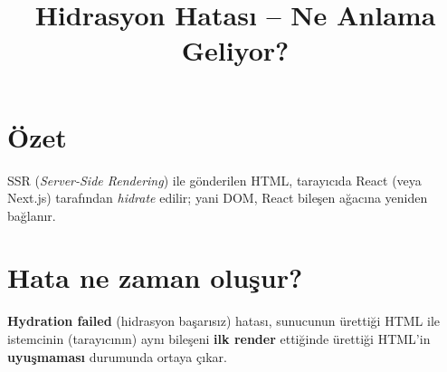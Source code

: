 \documentclass[11pt,a4paper]{article}
\title{\textbf{Hidrasyon Hatası -- Ne Anlama Geliyor?}}
\author{}
\date{}
\begin{document}
\maketitle

\section*{Özet}
SSR (\textit{Server-Side Rendering}) ile gönderilen HTML, tarayıcıda React (veya Next.js) tarafından \emph{hidrate} edilir; yani DOM, React bileşen ağacına yeniden bağlanır.

\section*{Hata ne zaman oluşur?}
\textbf{Hydration failed} (hidrasyon başarısız) hatası, sunucunun ürettiği HTML ile istemcinin (tarayıcının) aynı bileşeni \textbf{ilk render} ettiğinde ürettiği HTML'in \textbf{uyuşmaması} durumunda ortaya çıkar.
\end{document}
